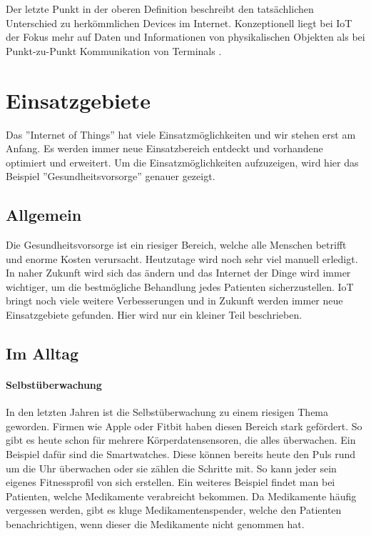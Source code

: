 Der letzte Punkt in der oberen Definition beschreibt den tatsächlichen Unterschied zu herkömmlichen Devices im Internet. Konzeptionell liegt bei IoT der Fokus mehr auf Daten und Informationen von physikalischen Objekten als bei Punkt-zu-Punkt Kommunikation von Terminals \cite{MiorandiSicariPellegriniChlamtac12}.

\newpage

\section{Einsatzgebiete}
Das ''Internet of Things'' hat viele Einsatzmöglichkeiten und wir stehen erst am Anfang. Es werden immer neue Einsatzbereich entdeckt und vorhandene optimiert und erweitert. Um die Einsatzmöglichkeiten aufzuzeigen, wird hier das Beispiel ''Gesundheitsvorsorge'' genauer gezeigt.
\subsection{Allgemein}
Die Gesundheitsvorsorge ist ein riesiger Bereich, welche alle Menschen betrifft und enorme Kosten verursacht. Heutzutage wird noch sehr viel manuell erledigt. In naher Zukunft wird sich das ändern und das Internet der Dinge wird immer wichtiger, um die bestmögliche Behandlung jedes Patienten sicherzustellen. IoT bringt noch viele weitere Verbesserungen und in Zukunft werden immer neue Einsatzgebiete gefunden. Hier wird nur ein kleiner Teil beschrieben. 
\subsection{Im Alltag}
\paragraph{Selbstüberwachung}
In den letzten Jahren ist die Selbstüberwachung zu einem riesigen Thema geworden. Firmen wie Apple oder Fitbit haben diesen Bereich stark gefördert. So gibt es heute schon für mehrere Körperdatensensoren, die alles überwachen. Ein Beispiel dafür sind die Smartwatches. Diese können bereits heute den Puls rund um die Uhr überwachen oder sie zählen die Schritte mit. So kann jeder sein eigenes Fitnessprofil von sich erstellen. Ein weiteres Beispiel findet man bei Patienten, welche Medikamente verabreicht bekommen. Da Medikamente häufig vergessen werden, gibt es kluge Medikamentenspender, welche den Patienten benachrichtigen, wenn dieser die Medikamente nicht genommen hat.
